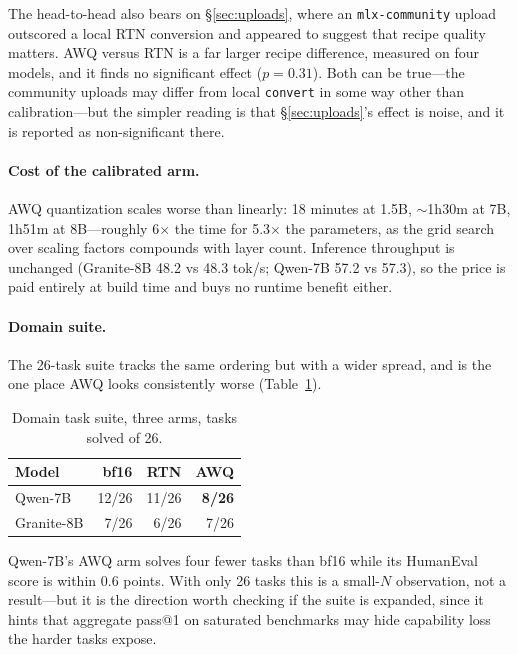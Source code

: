 \documentclass[11pt]{article}
\begin{document}
The head-to-head also bears on \S\ref{sec:uploads}, where an \texttt{mlx-community}
upload outscored a local RTN conversion and appeared to suggest that recipe quality
matters. AWQ versus RTN is a far larger recipe difference, measured on four models, and
it finds no significant effect ($p = 0.31$). Both can be true---the community uploads may
differ from local \texttt{convert} in some way other than calibration---but the simpler
reading is that \S\ref{sec:uploads}'s effect is noise, and it is reported as
non-significant there.

\paragraph{Cost of the calibrated arm.} AWQ quantization scales worse than linearly: 18
minutes at 1.5B, ${\sim}$1h30m at 7B, 1h51m at 8B---roughly 6$\times$ the time for
5.3$\times$ the parameters, as the grid search over scaling factors compounds with layer
count. Inference throughput is unchanged (Granite-8B 48.2 vs 48.3 tok/s; Qwen-7B 57.2 vs
57.3), so the price is paid entirely at build time and buys no runtime benefit either.

\paragraph{Domain suite.} The 26-task suite tracks the same ordering but with a wider
spread, and is the one place AWQ looks consistently worse (Table~\ref{tab:domainarms}).

\begin{table}[h]
  \centering
  \caption{Domain task suite, three arms, tasks solved of 26.}
  \label{tab:domainarms}
  \smallskip
  \begin{tabular}{lrrr}
    \toprule
    Model & bf16 & RTN & AWQ \\
    \midrule
    Qwen-7B    & 12/26 & 11/26 & \textbf{8/26} \\
    Granite-8B &  7/26 &  6/26 & 7/26 \\
    \bottomrule
  \end{tabular}
\end{table}

Qwen-7B's AWQ arm solves four fewer tasks than bf16 while its HumanEval score is within
0.6 points. With only 26 tasks this is a small-$N$ observation, not a result---but it is
the direction worth checking if the suite is expanded, since it hints that aggregate
pass@1 on saturated benchmarks may hide capability loss the harder tasks expose.
\end{document}
